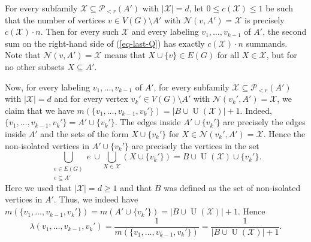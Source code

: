 \documentclass[11pt]{article}
\theoremstyle{definition}
\numberwithin{equation}{section}
\begin{document}
For every subfamily $\mathcal{X}\subseteq \mathcal{P}\!_{<r}(A')$ with $\vert \mathcal{X}\vert=d$, let $0\leq c(\mathcal{X})\leq 1$ be such that the number of vertices $v\in V(G)\setminus A'$ with $\mathcal{N}(v,A')=\mathcal{X}$ is precisely $c(\mathcal{X})\cdot n$. Then for every such $\mathcal{X}$ and every labeling $v_1,\dots,v_{k-1}$ of $A'$, the second sum on the right-hand side of (\ref{eq-last-Q}) has exactly $c(\mathcal{X})\cdot n$ summands. Note that $\mathcal{N}(v,A')=\mathcal{X}$ means that $X\cup \lbrace v\rbrace\in E(G)$ for all $X\in \mathcal{X}$, but for no other subsets $X\subseteq A'$.

Now, for every labeling $v_1,\dots,v_{k-1}$ of $A'$, for every subfamily $\mathcal{X}\subseteq \mathcal{P}\!_{<r}(A')$ with $\vert \mathcal{X}\vert=d$ and for every vertex $v_k'\in V(G)\setminus A'$ with $\mathcal{N}(v_k',A')=\mathcal{X}$, we claim that we have $m(\lbrace v_1,\dots,v_{k-1}, v_k'\rbrace)=\vert B\cup \operatorname{U}(\mathcal{X})\vert +1$. Indeed, $\lbrace v_1,\dots,v_{k-1}, v_k'\rbrace=A'\cup \lbrace v_k'\rbrace$. The edges inside $A'\cup \lbrace v_k'\rbrace$ are precisely the edges inside $A'$ and the sets of the form $X\cup \lbrace v_k'\rbrace$ for $X\in \mathcal{N}(v_k',A')=\mathcal{X}$. Hence the non-isolated vertices in $A'\cup \lbrace v_k'\rbrace$ are precisely the vertices in the set 
\[\bigcup_{\substack{e\in E(G)\\e\subseteq A'}}e\ \cup \bigcup_{X\in \mathcal{X}}(X\cup \lbrace v_k'\rbrace)=B\cup \operatorname{U}(\mathcal{X})\cup \lbrace v_k'\rbrace.\]
Here we used that $\vert \mathcal{X}\vert=d\geq 1$ and that $B$ was defined as the set of non-isolated vertices in $A'$. Thus, we indeed have $m(\lbrace v_1,\dots,v_{k-1}, v_k'\rbrace)=m(A'\cup \lbrace v_k'\rbrace)=\vert B\cup \operatorname{U}(\mathcal{X})\vert +1$. Hence
\[\lambda(v_1,\dots,v_{k-1}, v_k')=\frac{1}{m(\lbrace v_1,\dots,v_{k-1}, v_k'\rbrace)}=\frac{1}{\vert B\cup \operatorname{U}(\mathcal{X})\vert +1}.\]
\end{document}
